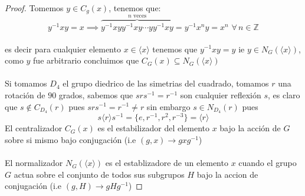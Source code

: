\documentclass[11pt,letterpaper]{article}
\newcommand{\Z}{\mathbb{Z}}
\begin{document}
\begin{proof}
    Tomemos $y\in C_g(x)$, tenemos que:\,\\
    \begin{equation*}
        y^{-1}xy=x\implies \overbrace{y^{-1}xyy^{-1}xy\cdots yy^{-1}xy}^{n\,\,\text{veces}}=y^{-1}x^{n}y=x^{n}\,\,\forall\,n\in \Z
    \end{equation*}\,\\
    es decir para cualquier elemento $x\in \langle x\rangle$ tenemos que $y^{-1}xy=y$ ie $y\in N_G(\langle x \rangle)$, como $y$ fue arbitrario concluimos que $C_{G}(x)\subseteq N_G(\langle x \rangle)$
    \,\\
    \,\\
    Si tomamos $D_4$ el grupo diedrico de las simetrias del cuadrado, tomamos $r$ una rotaci\'on de $90$ grados, sabemos que $srs^{-1}=r^{-1}$ son cualquier reflexi\'on $s$, es claro que $s\notin C_{D_4}(r)$ pues $srs^{-1}=r^{-1}\neq r$ sin embargo $s\in N_{D_4}(r)$ pues
    \begin{equation*}
        s\langle r \rangle s^{-1}=\{e,r^{-1},r^2,r^{-3}\}=\langle r \rangle
    \end{equation*}
    El centralizador $C_G(x)$ es el estabilizador del elemento $x$ bajo la acci\'on de $G$ sobre si mismo bajo conjugaci\'on (i.e $(g,x)\to gxg^{-1}$)\,\\
    \,\\
    El normalizador $N_G(\langle x \rangle)$ es el establizadore de un elemento $x$ cuando el grupo $G$ actua sobre el conjunto de todos sus subgrupos $H$ bajo la accion de conjugaci\'on (i.e $(g,H)\to gHg^{-1}$)
\end{proof}
\end{document}
